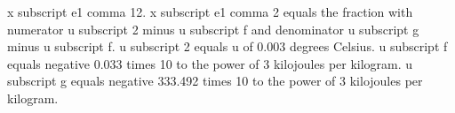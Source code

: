 x subscript e1 comma 12.
x subscript e1 comma 2 equals the fraction with numerator u subscript 2 minus u subscript f and denominator u subscript g minus u subscript f.
u subscript 2 equals u of 0.003 degrees Celsius.
u subscript f equals negative 0.033 times 10 to the power of 3 kilojoules per kilogram.
u subscript g equals negative 333.492 times 10 to the power of 3 kilojoules per kilogram.